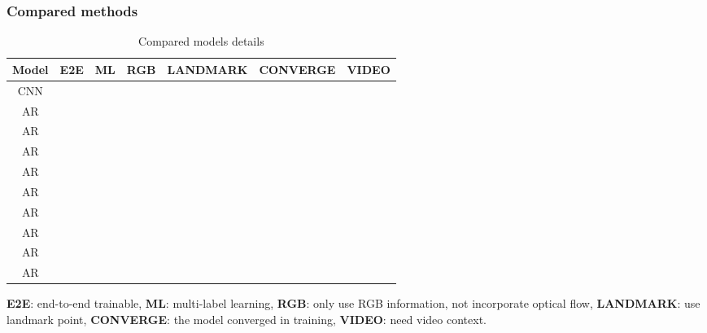 \documentclass[5p,twocolumn]{elsarticle}
\begin{document}
\subsubsection{Compared methods} 
\begin{table}[htp]
	\scriptsize	
	\caption{Compared models details}
	\label{tab:comparative_models}
	\centering
	\tabcolsep=0.15cm
	
	\begin{tabular}{ccccccc}
		\toprule
		\textbf{Model} & \textbf{E2E} & \textbf{ML} & \textbf{RGB} & \textbf{LANDMARK} & \textbf{CONVERGE} & \textbf{VIDEO} \\
		\midrule
		CNN &  &   &  &  &  &   \\
		AR &  &   &  &  &  &  \\
		AR &  &   &  &  &  &  \\
		AR &  &   &  &  &  &  \\
		AR &  &   &  &  &  &  \\
		AR &  &   &  &  &  &  \\
		AR &  &  &  &  &  &  \\
		AR &  &  &  &  &  &  \\
		AR &  &  &  &  &  &  \\
		AR &  &  &  &  &  &  \\
		\bottomrule
	\end{tabular}
	
	{\footnotesize * \textbf{E2E}: end-to-end trainable, \textbf{ML}: multi-label learning, \textbf{RGB}: only use RGB information, not incorporate optical flow, \textbf{LANDMARK}: use landmark point, \textbf{CONVERGE}: the model converged in training, \textbf{VIDEO}: need video context.}
\end{table}
\end{document}
